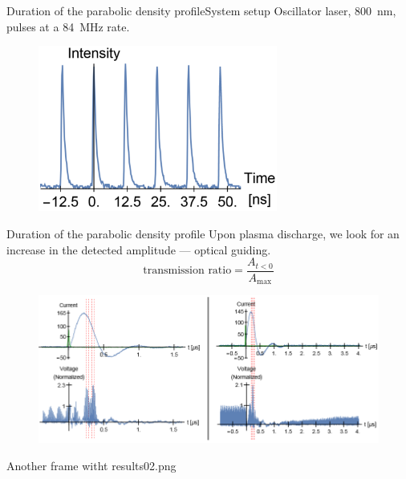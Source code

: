 \documentclass[draft]{beamer}
\begin{document}
  \begin{frame}{Duration of the parabolic density profile}{System setup}
    Oscillator laser, \SI{800}{\nm}, pulses at a \SI{84}{\MHz} rate.
    \begin{figure}
      \includegraphics[width=0.7\textwidth]{figures/results/oscillator/single.PNG}
    \end{figure}
  \end{frame}
  \begin{frame}{Duration of the parabolic density profile}
    Upon plasma discharge, we look for an increase in the detected amplitude --- optical guiding.
    \begin{equation*}
      \text{transmission ratio} = \frac{A_{t<0}}{A_\text{max}}
    \end{equation*}
    \begin{figure}
      \includegraphics[width=\textwidth]{figures/results/oscillator/results01.PNG}
    \end{figure}
  \end{frame}
  \begin{frame}
    Another frame witht results02.png
  \end{frame}
\end{document}
